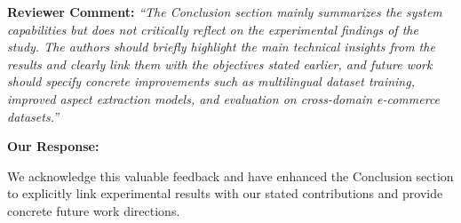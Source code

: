 \documentclass[11pt,a4paper]{article}
\begin{document}
\textbf{Reviewer Comment:} \textit{``The Conclusion section mainly summarizes the system capabilities but does not critically reflect on the experimental findings of the study. The authors should briefly highlight the main technical insights from the results and clearly link them with the objectives stated earlier, and future work should specify concrete improvements such as multilingual dataset training, improved aspect extraction models, and evaluation on cross-domain e-commerce datasets.''}

\vspace{6pt}

\textbf{Our Response:}

We acknowledge this valuable feedback and have enhanced the Conclusion section to explicitly link experimental results with our stated contributions and provide concrete future work directions.
\end{document}
